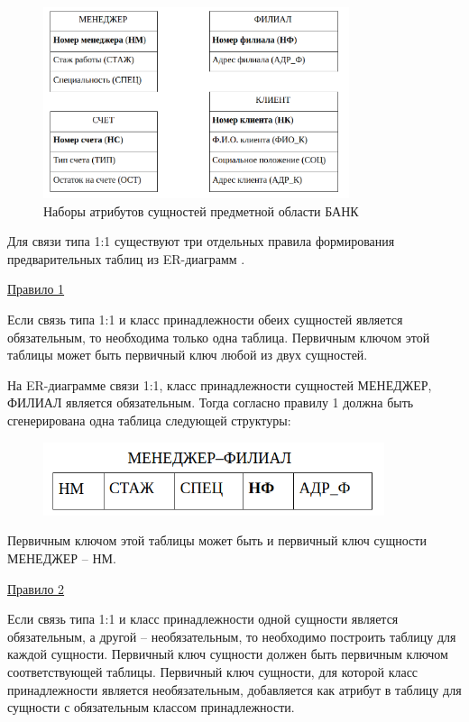 \begin{enumerate}
    \begin{figure}[H]
        \centering
        \includegraphics[width=0.8\textwidth]{assets/security/pic3.png}
        \caption{Наборы атрибутов сущностей предметной области БАНК}
        \label{fig:mesh05}
    \end{figure}

    Для связи типа 1:1 существуют три отдельных правила формирования предварительных таблиц из ER-диаграмм \autocite{design_db_4}.

    \underline{Правило 1}

    Если связь типа 1:1 и класс принадлежности обеих сущностей является обязательным, то необходима только одна
    таблица. Первичным ключом этой таблицы может быть первичный ключ любой из двух сущностей.

    На ER-диаграмме связи 1:1, класс принадлежности сущностей МЕНЕДЖЕР, ФИЛИАЛ является обязательным. Тогда согласно
    правилу 1 должна быть сгенерирована одна таблица следующей структуры:

    \begin{figure}[H]
        \centering
        \includegraphics[width=100mm]{assets/security/pic4.png}
        \label{fig:mesh06}
    \end{figure}

    Первичным ключом этой таблицы может быть и первичный ключ сущности МЕНЕДЖЕР – НМ.

    \underline{Правило 2}

    Если связь типа 1:1 и класс принадлежности одной сущности является обязательным, а другой – необязательным,
    то необходимо построить таблицу для каждой сущности. Первичный ключ сущности должен быть первичным ключом
    соответствующей таблицы. Первичный ключ сущности, для которой класс принадлежности является необязательным,
    добавляется как атрибут в таблицу для сущности с обязательным классом принадлежности.


\end{enumerate}
